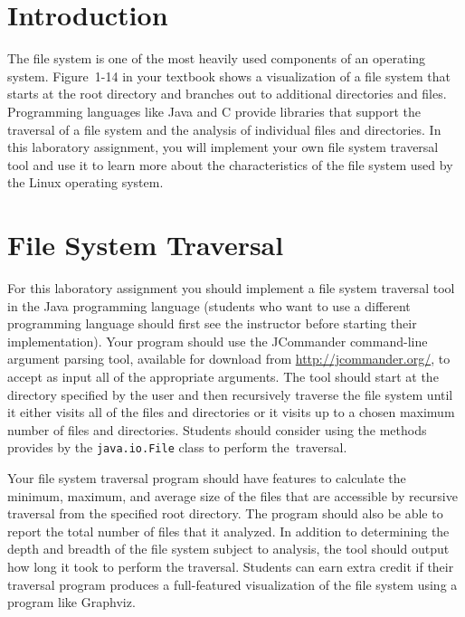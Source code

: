 

\usepackage[compact]{titlesec}



\section*{Introduction}

The file system is one of the most heavily used components of an operating system.  Figure~1-14 in your textbook shows a
visualization of a file system that starts at the root directory and branches out to additional directories and files.
Programming languages like Java and C provide libraries that support the traversal of a file system and the analysis of individual
files and directories. In this laboratory assignment, you will implement your own file system traversal tool and use it to learn
more about the characteristics of the file system used by the Linux operating system.

\section*{File System Traversal}

For this laboratory assignment you should implement a file system traversal tool in the Java programming language
(students who want to use a different programming language should first see the instructor before starting their
implementation). Your program should use the JCommander command-line argument parsing tool, available for download from
\url{http://jcommander.org/}, to accept as input all of the appropriate arguments. The tool should start at the
directory specified by the user and then recursively traverse the file system until it either visits all of the files
and directories or it visits up to a chosen maximum number of files and directories. Students should consider using the
methods provides by the {\tt java.io.File} class to perform \mbox{the traversal}.

Your file system traversal program should have features to calculate the minimum, maximum, and average size of the files that are
accessible by recursive traversal from the specified root directory. The program should also be able to report the total number of
files that it analyzed.  In addition to determining the depth and breadth of the file system subject to analysis, the tool should
output how long it took to perform the traversal. Students can earn extra credit if their traversal program produces a
full-featured visualization of the file system using a program like Graphviz.

